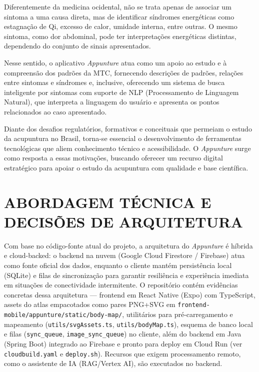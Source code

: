 Diferentemente da medicina ocidental, não se trata apenas de associar um sintoma a uma causa direta, mas de identificar síndromes energéticas como estagnação de Qi, excesso de calor, umidade interna, entre outras. O mesmo sintoma, como dor abdominal, pode ter interpretações energéticas distintas, dependendo do conjunto de sinais apresentados.

Nesse sentido, o aplicativo \textit{Appunture} atua como um apoio ao estudo e à compreensão dos padrões da MTC, fornecendo descrições de padrões, relações entre sintomas e síndromes e, inclusive, oferecendo um sistema de busca inteligente por sintomas com suporte de NLP (Processamento de Linguagem Natural), que interpreta a linguagem do usuário e apresenta os pontos relacionados ao caso apresentado.

Diante dos desafios regulatórios, formativos e conceituais que permeiam o estudo da acupuntura no Brasil, torna-se essencial o desenvolvimento de ferramentas tecnológicas que aliem conhecimento técnico e acessibilidade. O \textit{Appunture} surge como resposta a essas motivações, buscando oferecer um recurso digital estratégico para apoiar o estudo da acupuntura com qualidade e base científica.

\section{ABORDAGEM TÉCNICA E DECISÕES DE ARQUITETURA} \label{sec:arquitetura_decisoes}

Com base no código-fonte atual do projeto, a arquitetura do \textit{Appunture} é híbrida e cloud-backed: o backend na nuvem (Google Cloud Firestore / Firebase) atua como fonte oficial dos dados, enquanto o cliente mantém persistência local (SQLite) e filas de sincronização para garantir resiliência e experiência imediata em situações de conectividade intermitente. O repositório contém evidências concretas dessa arquitetura — frontend em React Native (Expo) com TypeScript, assets do atlas empacotados como pares PNG+SVG em \texttt{frontend-mobile/appunture/static/body-map/}, utilitários para pré-carregamento e mapeamento (\texttt{utils/svgAssets.ts}, \texttt{utils/bodyMap.ts}), esquema de banco local e filas (\texttt{sync\_queue}, \texttt{image\_sync\_queue}) no cliente, além do backend em Java (Spring Boot) integrado ao Firebase e pronto para deploy em Cloud Run (ver \texttt{cloudbuild.yaml} e \texttt{deploy.sh}). Recursos que exigem processamento remoto, como o assistente de IA (RAG/Vertex AI), são executados no backend.


